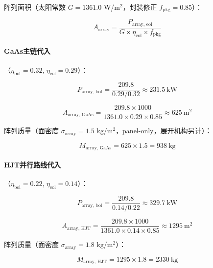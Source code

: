 阵列面积（太阳常数 $G = 1361.0$ W/m$^2$，封装修正 $f_{\text{pkg}} = 0.85$）：

\begin{equation}
  A_{\text{array}} = \frac{P_{\text{array, eol}}}{G \times \eta_{\text{eol}} \times f_{\text{pkg}}}
  \label{eq:array-area}
\end{equation}

\paragraph{GaAs主链代入}（$\eta_{\text{bol}} = 0.32$, $\eta_{\text{eol}} = 0.29$）：

\begin{equation}
  P_{\text{array, bol}} = \frac{209.8}{0.29/0.32} \approx 231.5\ \text{kW}
\end{equation}

\begin{equation}
  A_{\text{array, GaAs}} = \frac{209.8 \times 1000}{1361.0 \times 0.29 \times 0.85} \approx 625\ \text{m}^{2}
\end{equation}

阵列质量（面密度 $\sigma_{\text{array}} = 1.5$ kg/m$^2$，panel-only，展开机构另计）：

\begin{equation}
  M_{\text{array, GaAs}} = 625 \times 1.5 = 938\ \text{kg}
\end{equation}

\paragraph{HJT并行路线代入}（$\eta_{\text{bol}} = 0.22$, $\eta_{\text{eol}} = 0.14$）：

\begin{equation}
  P_{\text{array, bol}} = \frac{209.8}{0.14/0.22} \approx 329.7\ \text{kW}
\end{equation}

\begin{equation}
  A_{\text{array, HJT}} = \frac{209.8 \times 1000}{1361.0 \times 0.14 \times 0.85} \approx 1295\ \text{m}^{2}
\end{equation}

阵列质量（面密度 $\sigma_{\text{array}} = 1.8$ kg/m$^2$）：

\begin{equation}
  M_{\text{array, HJT}} = 1295 \times 1.8 = 2330\ \text{kg}
\end{equation}

